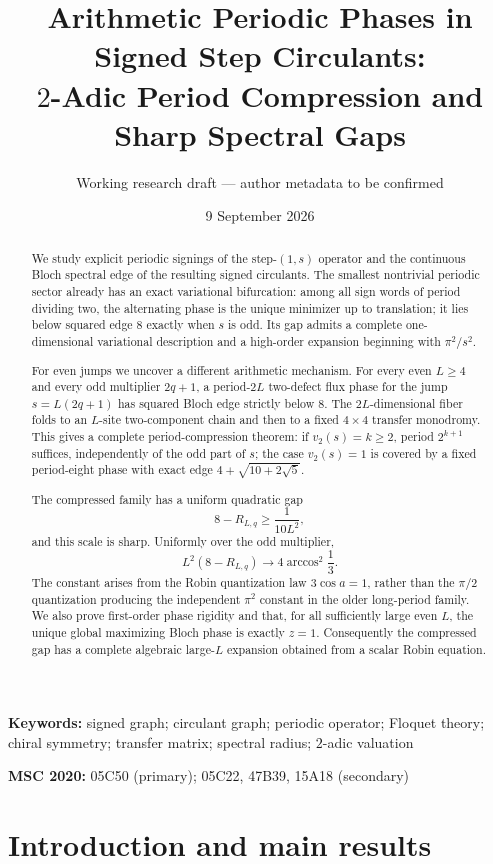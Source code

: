 \documentclass[11pt]{article}
\title{Arithmetic Periodic Phases in Signed Step Circulants:\\
$2$-Adic Period Compression and Sharp Spectral Gaps}
\author{Working research draft --- author metadata to be confirmed}
\date{9 September 2026}
\theoremstyle{remark}
\newcommand{\vTwo}{v_2}
\begin{document}
\maketitle

\begin{abstract}
We study explicit periodic signings of the step-$(1,s)$ operator and the
continuous Bloch spectral edge of the resulting signed circulants.  The
smallest nontrivial periodic sector already has an exact variational
bifurcation: among all sign words of period dividing two, the alternating
phase is the unique minimizer up to translation; it lies below squared edge
$8$ exactly when $s$ is odd.  Its gap admits a complete one-dimensional
variational description and a high-order expansion beginning with
$\pi^2/s^2$.

For even jumps we uncover a different arithmetic mechanism.  For every even
$L\ge4$ and every odd multiplier $2q+1$, a period-$2L$ two-defect flux phase
for the jump $s=L(2q+1)$ has squared Bloch edge strictly below $8$.  The
$2L$-dimensional fiber folds to an $L$-site two-component chain and then to a
fixed $4\times4$ transfer monodromy.  This gives a complete period-compression
theorem: if $\vTwo(s)=k\ge2$, period $2^{k+1}$ suffices, independently of the
odd part of $s$; the case $\vTwo(s)=1$ is covered by a fixed period-eight
phase with exact edge $4+\sqrt{10+2\sqrt5}$.

The compressed family has a uniform quadratic gap
\[
 8-R_{L,q}\ge \frac1{10L^2},
\]
and this scale is sharp.  Uniformly over the odd multiplier,
\[
 L^2(8-R_{L,q})\longrightarrow
 4\arccos^2\frac13.
\]
The constant arises from the Robin quantization law $3\cos a=1$, rather than
the $\pi/2$ quantization producing the independent $\pi^2$ constant in the
older long-period family.  We also prove first-order phase rigidity and that,
for all sufficiently large even $L$, the unique global maximizing Bloch phase
is exactly $z=1$.  Consequently the compressed gap has a complete algebraic
large-$L$ expansion obtained from a scalar Robin equation.
\end{abstract}

\noindent\textbf{Keywords:} signed graph; circulant graph; periodic operator;
Floquet theory; chiral symmetry; transfer matrix; spectral radius; $2$-adic
valuation

\medskip
\noindent\textbf{MSC 2020:} 05C50 (primary); 05C22, 47B39, 15A18 (secondary)

\section{Introduction and main results}
\end{document}
